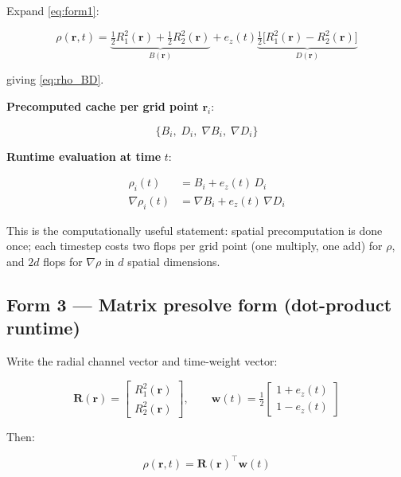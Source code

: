 \documentclass[11pt, a4paper, oneside]{article}
\newcommand{\Ri}[1]{R_{#1}^2(\mathbf{r})}          %
\newcommand{\ez}{e_z(t)}
\newcommand{\Bvec}{B(\mathbf{r})}
\newcommand{\Dvec}{D(\mathbf{r})}
\newcommand{\wvec}{\mathbf{w}(t)}
\newcommand{\Rvec}{\mathbf{R}(\mathbf{r})}
\begin{document}
Expand \eqref{eq:form1}:

\begin{equation}
  \rho(\mathbf{r},t)
  = \underbrace{\tfrac{1}{2}\Ri{1} + \tfrac{1}{2}\Ri{2}}_{\Bvec}
  + \ez\underbrace{\tfrac{1}{2}\bigl[\Ri{1}-\Ri{2}\bigr]}_{\Dvec}
  \label{eq:form2_expand}
\end{equation}

giving \eqref{eq:rho_BD}.

\medskip
\noindent\textbf{Precomputed cache per grid point} $\mathbf{r}_i$:

\begin{equation}
  \bigl\{B_i,\; D_i,\; \nabla B_i,\; \nabla D_i\bigr\}
  \label{eq:cache}
\end{equation}

\noindent\textbf{Runtime evaluation at time} $t$:

\begin{align}
  \rho_i(t)       &= B_i + \ez\,D_i          \label{eq:rt_rho} \\
  \nabla\rho_i(t) &= \nabla B_i + \ez\,\nabla D_i  \label{eq:rt_grad}
\end{align}

This is the computationally useful statement: spatial precomputation is
done once; each timestep costs two flops per grid point (one multiply,
one add) for $\rho$, and $2d$ flops for $\nabla\rho$ in $d$ spatial
dimensions.

\subsection{Form 3 — Matrix presolve form (dot-product runtime)}

Write the radial channel vector and time-weight vector:

\begin{equation}
  \Rvec =
  \begin{bmatrix} \Ri{1} \\ \Ri{2} \end{bmatrix},
  \qquad
  \wvec = \tfrac{1}{2}
  \begin{bmatrix} 1+\ez \\ 1-\ez \end{bmatrix}
  \label{eq:Rw}
\end{equation}

Then:

\begin{equation}
  \boxed{\rho(\mathbf{r},t) = \Rvec^\top \wvec}
  \label{eq:form3}
\end{equation}
\end{document}
